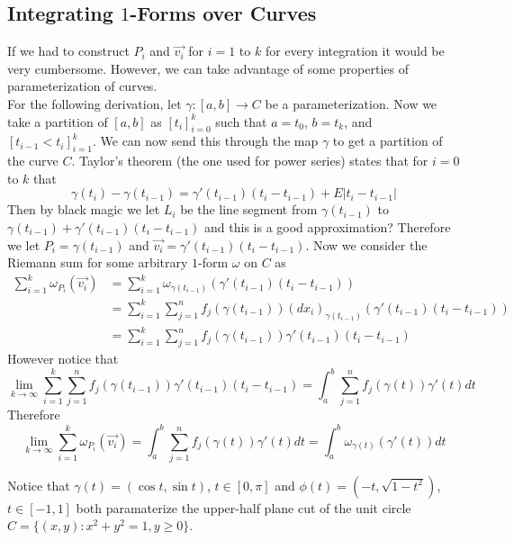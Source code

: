 \documentclass[notes.tex]{subfiles}
\begin{document}
\subsection{Integrating $1$-Forms over Curves}
If we had to construct $P_i$ and $\vec{v_i}$ for $i = 1$ to $k$ for every integration it would be very cumbersome. However, we can take advantage of some properties of parameterization of curves. \\
For the following derivation, let $\gamma\colon[a, b] \to C$ be a parameterization. Now we take a partition of $[a, b]$ as $[t_i]_{i = 0}^k$ such that $a = t_0$, $b = t_k$, and $[t_{i - 1} < t_i]_{i = 1}^k$. We can now send this through the map $\gamma$ to get a partition of the curve $C$. Taylor's theorem (the one used for power series) states that for $i = 0$ to $k$ that
\[
    \gamma(t_i) - \gamma(t_{i - 1}) = \gamma'(t_{i - 1})(t_i - t_{i -1}) + E|t_i - t_{i - 1}|
\]
Then by black magic we let $L_i$ be the line segment from $\gamma(t_{i - 1})$ to $\gamma(t_{i - 1}) + \gamma'(t_{i - 1})(t_i - t_{i - 1})$ and this is a good approximation? Therefore we let $P_i = \gamma(t_{i - 1})$ and $\vec{v_i} = \gamma'(t_{i - 1})(t_i - t_{i - 1})$. Now we consider the Riemann sum for some arbitrary $1$-form $\omega$ on $C$ as
\begin{align*}
    \sum_{i = 1}^k \omega_{P_i}(\vec{v_i})
    &= \sum_{i = 1}^k \omega_{\gamma(t_{i - 1})}(\gamma'(t_{i - 1})(t_i - t_{i - 1})) \\
    &= \sum_{i = 1}^k \sum_{j = 1}^n f_j(\gamma(t_{i - 1}))(dx_i)_{\gamma(t_{i - 1})}(\gamma'(t_{i - 1})(t_i - t_{i - 1})) \\
    &= \sum_{i = 1}^k \sum_{j = 1}^n f_j(\gamma(t_{i - 1}))\gamma'(t_{i - 1})(t_i - t_{i - 1})
\end{align*}
However notice that
\[
    \lim_{k\to\infty} \sum_{i = 1}^k \sum_{j = 1}^n f_j(\gamma(t_{i - 1}))\gamma'(t_{i - 1})(t_i - t_{i - 1}) = \int_a^b \sum_{j = 1}^n f_j(\gamma(t))\gamma'(t)dt
\]
Therefore
\[
    \lim_{k\to\infty} \sum_{i = 1}^k \omega_{P_i}(\vec{v_i}) = \int_a^b \sum_{j = 1}^n f_j(\gamma(t))\gamma'(t)dt = \int_a^b \omega_{\gamma(t)}(\gamma'(t))dt
\]

Notice that $\gamma(t) = (\cos t, \sin t)$, $t \in [0, \pi]$ and $\phi(t) = (-t, \sqrt{1 - t^2})$, $t \in [-1, 1]$ both paramaterize the upper-half plane cut of the unit circle $C = \{ (x, y) : x^2 + y^2 = 1, y \geq 0 \}$.
\end{document}
